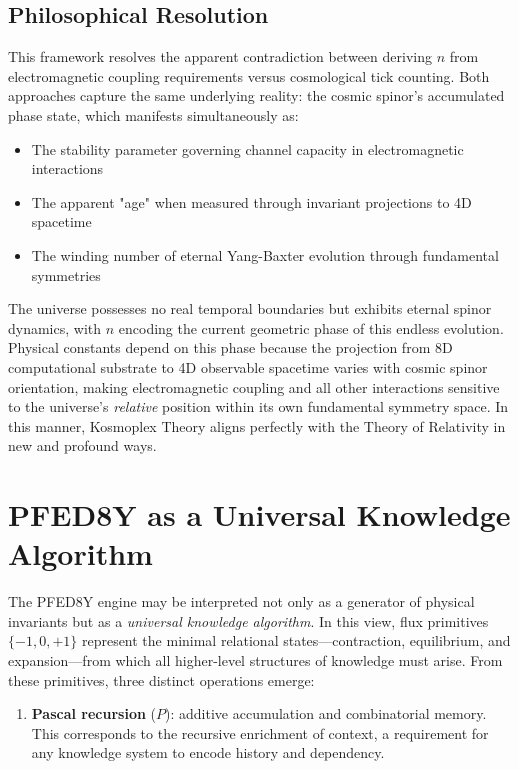 \documentclass[pdflatex,sn-mathphys-num]{sn-jnl}
\theoremstyle{thmstyleone}
\theoremstyle{thmstyletwo}
\theoremstyle{thmstylethree}
\begin{document}
\begin{appendices}
\subsection{Philosophical Resolution}

This framework resolves the apparent contradiction between deriving $n$ from electromagnetic coupling requirements versus cosmological tick counting. Both approaches capture the same underlying reality: the cosmic spinor's accumulated phase state, which manifests simultaneously as:

\begin{itemize}
\item The stability parameter governing channel capacity in electromagnetic interactions
\item The apparent "age" when measured through invariant projections to 4D spacetime
\item The winding number of eternal Yang-Baxter evolution through fundamental symmetries
\end{itemize}

The universe possesses no real temporal boundaries but exhibits eternal spinor dynamics, with $n$ encoding the current geometric phase of this endless evolution. Physical constants depend on this phase because the projection from 8D computational substrate to 4D observable spacetime varies with cosmic spinor orientation, making electromagnetic coupling and all other interactions sensitive to the universe's \textit{relative} position within its own fundamental symmetry space.  In this manner, Kosmoplex Theory aligns perfectly with the Theory of Relativity in new and profound ways.  

\section{PFED8Y as a Universal Knowledge Algorithm}

The PFED8Y engine may be interpreted not only as a generator of physical invariants
but as a \emph{universal knowledge algorithm}. In this view, flux primitives
$\{-1,0,+1\}$ represent the minimal relational states---contraction, equilibrium,
and expansion---from which all higher-level structures of knowledge must arise.
From these primitives, three distinct operations emerge:

\begin{enumerate}
    \item \textbf{Pascal recursion} ($P$): additive accumulation and combinatorial
    memory. This corresponds to the recursive enrichment of context, a requirement
    for any knowledge system to encode history and dependency.


\end{enumerate}
\end{appendices}
\end{document}

